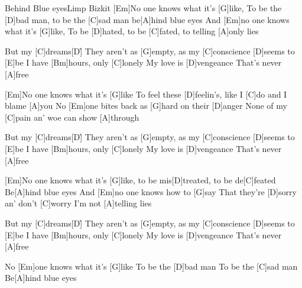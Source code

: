 \documentclass[../main.tex]{subfiles}
\begin{document}
\begin{song}{Behind Blue eyes}{Limp Bizkit}{}       
[Em]No one knows what it's [G]like,
To be the [D]bad man, to be the [C]sad man be[A]hind blue eyes
And [Em]no one knows what it's [G]like,
To be [D]hated, to be [C]fated, to telling [A]only lies

But my [C]dreams[D]{\h}
They aren't as [G]empty, as my [C]conscience [D]seems to [E]be
I have [Bm]hours, only [C]lonely
My love is [D]vengeance
That's never [A]free

[Em]No one knows what it's [G]like
To feel these [D]feelin's, like I [C]do and I blame [A]you
No [Em]one bites back as [G]hard on their [D]anger
None of my [C]pain an' woe can show [A]through

But my [C]dreams[D]{\h}
They aren't as [G]empty, as my [C]conscience [D]seems to [E]be
I have [Bm]hours, only [C]lonely
My love is [D]vengeance
That's never [A]free

[Em]No one knows what it's [G]like, to be mis[D]treated, to be de[C]feated
Be[A]hind blue eyes
And [Em]no one knows how to [G]say
That they're [D]sorry an' don't [C]worry
I'm not [A]telling lies

But my [C]dreams[D]{\h}
They aren't as [G]empty, as my [C]conscience [D]seems to [E]be
I have [Bm]hours, only [C]lonely
My love is [D]vengeance
That's never [A]free

No [Em]one knows what it's [G]like
To be the [D]bad man
To be the [C]sad man
Be[A]hind blue eyes

\end{song}
\end{document}
